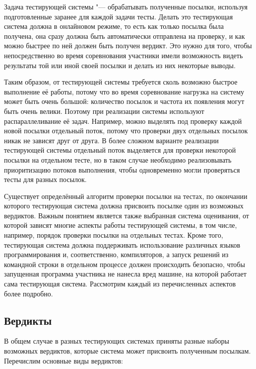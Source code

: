 Задача тестирующей системы "--- обрабатывать полученные посылки, используя подготовленные заранее для каждой задачи тесты. Делать это тестирующая система должна в онлайновом режиме, то есть как только посылка была получена, она сразу должна быть автоматически отправлена на проверку, и как можно быстрее по ней должен быть получен вердикт. Это нужно для того, чтобы непосредственно во время соревнования участники имели возможность видеть результаты той или иной своей посылки и делать из них некоторые выводы.

Таким образом, от тестирующей системы требуется сколь возможно быстрое выполнение её работы, потому что во время соревнование нагрузка на систему может быть очень большой: количество посылок и частота их появления могут быть очень велики. Поэтому при реализации системы используют распараллеливание её задач. Например, можно выделять под проверку каждой новой посылки отдельный поток, потому что проверки двух отдельных посылок никак не зависят друг от друга. В более сложном варианте реализации тестирующей системы отдельный поток выделяется для проверки некоторой посылки на отдельном тесте, но в таком случае необходимо реализовывать приоритизацию потоков выполнения, чтобы одновременно могли проверяться тесты для разных посылок.

Существует определённый алгоритм проверки посылки на тестах, по окончании которого тестирующая система должна присвоить посылке один из возможных вердиктов. Важным понятием является также выбранная система оценивания, от которой зависят многие аспекты работы тестирующей системы, в том числе, например, порядок проверки посылки на отдельных тестах. Кроме того, тестирующая система должна поддерживать использование различных языков программирования и, соответственно, компиляторов, а запуск решений из командной строки в отдельном процессе должен происходить безопасно, чтобы запущенная программа участника не нанесла вред машине, на которой работает сама тестирующая система. Рассмотрим каждый из перечисленных аспектов более подробно.

\subsection{Вердикты}

В общем случае в разных тестирующих системах приняты разные наборы возможных вердиктов, которые система может присвоить полученным посылкам. Перечислим основные виды вердиктов:

